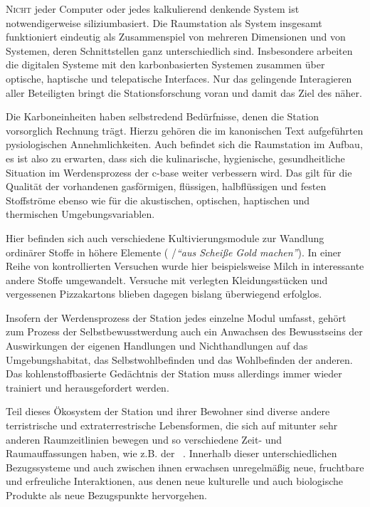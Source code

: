 \begin{newstuff}
    \lettrine{N}{icht} jeder Computer oder jedes kalkulierend denkende System ist notwendigerweise siliziumbasiert. Die Raumstation als System insgesamt funktioniert eindeutig als Zusammenspiel von mehreren Dimensionen und von Systemen, deren Schnittstellen ganz unterschiedlich sind. Insbesondere arbeiten die digitalen Systeme mit den karbonbasierten Systemen zusammen über optische, haptische und telepatische Interfaces. 
    Nur das gelingende Interagieren aller Beteiligten bringt die Stationsforschung voran und damit das Ziel des  näher.

    
    Die Karboneinheiten haben selbstredend Bedürfnisse, denen die Station vorsorglich Rechnung trägt.
    Hierzu gehören die im kanonischen Text aufgeführten pysiologischen Annehmlichkeiten. Auch befindet sich die  Raumstation im Aufbau, es ist also zu erwarten, dass sich die kulinarische, hygienische, gesundheitliche Situation im Werdensprozess der c-base weiter verbessern wird. Das gilt für die Qualität der vorhandenen gasförmigen, flüssigen, halbflüssigen und festen Stoffströme ebenso wie für die akustischen, optischen, haptischen und thermischen Umgebungsvariablen. 

    Hier befinden sich auch verschiedene Kultivierungsmodule zur Wandlung ordinärer Stoffe in höhere Elemente ( /\emph{"`aus Scheiße Gold machen"'}). In einer Reihe von kontrollierten Versuchen wurde hier beispielsweise Milch in interessante andere Stoffe umgewandelt. Versuche mit verlegten Kleidungsstücken und vergessenen \mbox{Pizza}\-kartons blieben dagegen bislang überwiegend erfolglos.
  
    Insofern der Werdensprozess der Station jedes einzelne Modul umfasst, gehört zum Prozess der Selbstbewusstwerdung auch ein Anwachsen des Bewusstseins der Auswirkungen der eigenen Handlungen und Nichthandlungen auf das Umgebungshabitat, das Selbstwohlbefinden und das Wohlbefinden der anderen. Das kohlenstoffbasierte Gedächtnis der Station muss allerdings immer wieder trainiert und herausgefordert werden.

    Teil dieses Ökosystem der Station und ihrer Bewohner sind diverse andere terristrische und extraterrestrische Lebensformen, die sich auf mitunter sehr anderen Raumzeitlinien bewegen und so verschiedene Zeit- und Raumauffassungen haben, wie z.B. der ~\cite{symbiont}. Innerhalb dieser unterschiedlichen Bezugssysteme und auch zwischen ihnen erwachsen unregelmäßig neue, fruchtbare und erfreuliche Interaktionen, aus denen neue kulturelle und auch biologische Produkte als neue Bezugspunkte hervorgehen. 


\end{newstuff}
